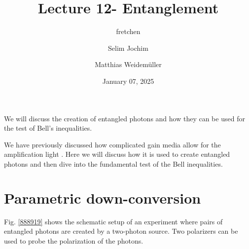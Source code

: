 \documentclass[10pt]{article}
\let\cite\citep
\renewenvironment{abstract}
  {{\bfseries\noindent{\abstractname}\par\nobreak}\footnotesize}
  {\bigskip}
\providecommand\citep{\cite}
\begin{document}
\title{Lecture 12- Entanglement}



\author[1]{fretchen}%
\author[2]{Selim Jochim}%
\author[2]{Matthias Weidemüller}%
%
%


\vspace{-1em}



  
  \date{January 07, 2025}


\begingroup
\let\center\flushleft
\let\endcenter\endflushleft
\maketitle
\endgroup





\begin{abstract}
We will discuss the creation of entangled photons and how they can be used for the test of Bell's inequalities.%
\end{abstract}%



\sloppy


We have previously discussed how complicated gain media allow for the amplification light \cite{Jendrzejewski}. Here we will discuss how it is used to create entangled photons and then dive into the fundamental test of the Bell inequalities.

\section{Parametric down-conversion}

Fig. \ref{888919} shows the schematic setup of an experiment where pairs of entangled photons are created by a two-photon source. Two polarizers can be used to probe the polarization of the photons.
\end{document}
